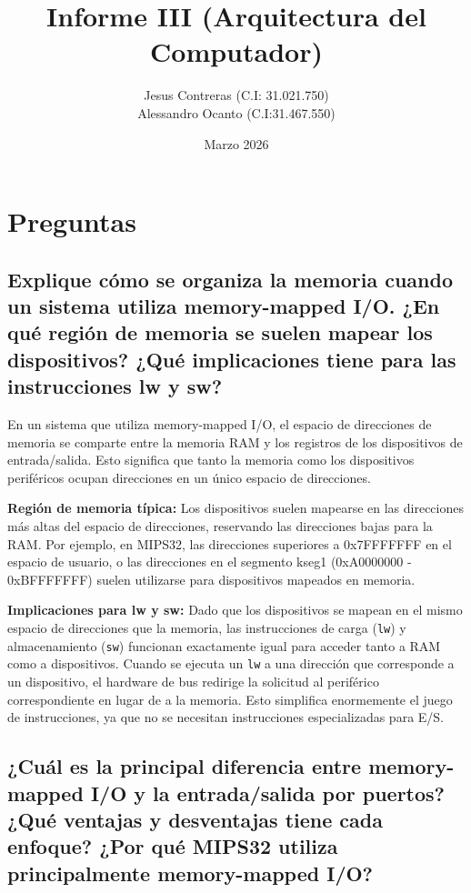 \documentclass[12pt]{article}
\title{Informe III (Arquitectura del Computador)}
\author{Jesus Contreras (C.I: 31.021.750)\\Alessandro Ocanto (C.I:31.467.550)}
\date{Marzo 2026}
\begin{document}
	
	\maketitle
	
\section{Preguntas}
	
\subsection{Explique cómo se organiza la memoria cuando un sistema utiliza memory-mapped I/O. ¿En qué región de memoria se suelen mapear los dispositivos? ¿Qué implicaciones tiene para las instrucciones lw y sw?}
	
	En un sistema que utiliza memory-mapped I/O, el espacio de direcciones de memoria se comparte entre la memoria RAM y los registros de los dispositivos de entrada/salida. Esto significa que tanto la memoria como los dispositivos periféricos ocupan direcciones en un único espacio de direcciones.
	
	\textbf{Región de memoria típica:} Los dispositivos suelen mapearse en las direcciones más altas del espacio de direcciones, reservando las direcciones bajas para la RAM. Por ejemplo, en MIPS32, las direcciones superiores a 0x7FFFFFFF en el espacio de usuario, o las direcciones en el segmento kseg1 (0xA0000000 - 0xBFFFFFFF) suelen utilizarse para dispositivos mapeados en memoria.
	
	\textbf{Implicaciones para lw y sw:} Dado que los dispositivos se mapean en el mismo espacio de direcciones que la memoria, las instrucciones de carga (\texttt{lw}) y almacenamiento (\texttt{sw}) funcionan exactamente igual para acceder tanto a RAM como a dispositivos. Cuando se ejecuta un \texttt{lw} a una dirección que corresponde a un dispositivo, el hardware de bus redirige la solicitud al periférico correspondiente en lugar de a la memoria. Esto simplifica enormemente el juego de instrucciones, ya que no se necesitan instrucciones especializadas para E/S.
	
\subsection{¿Cuál es la principal diferencia entre memory-mapped I/O y la entrada/salida por puertos? ¿Qué ventajas y desventajas tiene cada enfoque? ¿Por qué MIPS32 utiliza principalmente memory-mapped I/O?}
	
\end{document}
